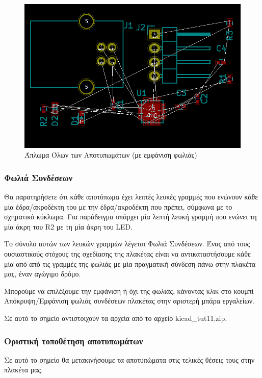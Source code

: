 \documentclass[a4paper]{article}
\begin{document}
\begin{figure}
  \begin{center}
    \includegraphics[width=.9\textwidth]{img/pcb-circ-allspreadrat.png}
    \caption{Άπλωμα Όλων των Αποτυπωμάτων (με εμφάνιση φωλιάς)}
    \label{fig:pcb-circ-allspreadrat}
  \end{center}
\end{figure}

\subsubsection{Φωλιά Συνδέσεων}
Θα παρατηρήσετε ότι κάθε αποτύπωμα έχει λεπτές λευκές γραμμές που ενώνουν κάθε μία έδρα/ακροδέκτη του με την έδρα/ακροδέκτη που πρέπει, σύμφωνα με το σχηματικό κύκλωμα. Για παράδειγμα υπάρχει μία λεπτή λευκή γραμμή που ενώνει τη μία άκρη του R2 με τη μία άκρη του LED. 

Το σύνολο αυτών των λευκών γραμμών λέγεται Φωλιά Συνδέσεων. Ένας από τους ουσιαστικούς στόχους της σχεδίασης της πλακέτας είναι να αντικαταστήσουμε κάθε μία από από τις γραμμές της φωλιάς με μία πραγματική σύνδεση πάνω στην πλακέτα μας, έναν αγώγιμο δρόμο. 

Μπορούμε να επιλέξουμε την εμφάνιση ή όχι της φωλιάς, κάνοντας κλικ στο κουμπί Απόκρυψη/Εμφάνιση φωλιάς συνδέσεων πλακέτας στην αριστερή μπάρα εργαλείων.

Σε αυτό το σημείο αντιστοιχούν τα αρχεία από το αρχείο kicad\_tut11.zip.

\subsubsection{Οριστική τοποθέτηση αποτυπωμάτων}

Σε αυτό το σημείο θα μετακινήσουμε τα αποτυπώματα στις τελικές θέσεις τους στην πλακέτα μας. 
\end{document}
